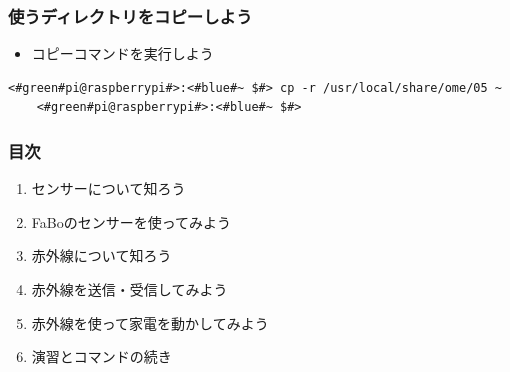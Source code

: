 \documentclass[slide05.tex]{subfiles}
\begin{document}


\begin{frame}[fragile]
    \frametitle{使うディレクトリをコピーしよう}
    \begin{itemize}
        \item コピーコマンドを実行しよう
    \end{itemize}
    \vspace{10pt}
    \begin{lstlisting}[title=ディレクトリのコピー,label=workfilecopy]
    <#green#pi@raspberrypi#>:<#blue#~ $#> cp -r /usr/local/share/ome/05 ~
    <#green#pi@raspberrypi#>:<#blue#~ $#>
    \end{lstlisting}
\end{frame}

\begin{frame}[fragile]
    \frametitle{目次}
    \begin{enumerate}
        \item センサーについて知ろう
        \item FaBoのセンサーを使ってみよう
        \item 赤外線について知ろう
        \item 赤外線を送信・受信してみよう
        \item 赤外線を使って家電を動かしてみよう
        \item 演習とコマンドの続き
    \end{enumerate}
\end{frame}
\end{document}
